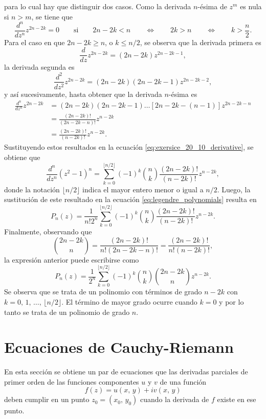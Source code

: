 \documentclass[a4paper]{report}
\begin{document}
para lo cual hay que distinguir dos casos. Como la derivada \(n\)-ésima de \(z^m\) es nula si \(n>m\), se tiene que 
\[
 \frac{d^n}{dz^n}z^{2n-2k}=0
 \qquad\textrm{si}\qquad
 2n-2k<n\qquad\Leftrightarrow\qquad 2k>n \qquad\Leftrightarrow\qquad k>\frac{n}{2}.
\]
Para el caso en que \(2n-2k\geq n\), o \(k\leq n/2\), se observa que la derivada primera es
\[
 \frac{d}{dz}z^{2n-2k}=(2n-2k)z^{2n-2k-1},
\]
la derivada segunda es
\[
 \frac{d^2}{dz^2}z^{2n-2k}=(2n-2k)(2n-2k-1)z^{2n-2k-2},
\]
y así sucesivamente, hasta obtener que la derivada \(n\)-ésima es
\begin{align*}
 \frac{d^n}{dz^n}z^{2n-2k}&=(2n-2k)(2n-2k-1)\dots[2n-2k-(n-1)]z^{2n-2k-n}\\
  &=\frac{(2n-2k)!}{(2n-2k-n)!}z^{n-2k}\\
  &=\frac{(2n-2k)!}{(n-2k)!}z^{n-2k}.
\end{align*}
Sustituyendo estos resultados en la ecuación \ref{eq:exersice_20_10_derivative}, se obtiene que 
\[
 \frac{d^n}{dz^n}(z^2-1)^n=\sum_{k=0}^{\lfloor n/2\rfloor}(-1)^k\binom{n}{k}\frac{(2n-2k)!}{(n-2k)!}z^{n-2k},
\]
donde la notación \(\lfloor n/2\rfloor\) indica el mayor entero menor o igual a \(n/2\). Luego, la sustitución de este resultado en la ecuación \ref{eq:legendre_polynomials} resulta en 
\[
 P_n(z)=\frac{1}{n!2^n}\sum_{k=0}^{\lfloor n/2\rfloor}(-1)^k\binom{n}{k}\frac{(2n-2k)!}{(n-2k)!}z^{n-2k}.
\]
Finalmente, observando que 
\[
 \binom{2n-2k}{n}=\frac{(2n-2k)!}{n!(2n-2k-n)!}=\frac{(2n-2k)!}{n!(n-2k)!},
\]
la expresión anterior puede escribirse como
\[
 P_n(z)=\frac{1}{2^n}\sum_{k=0}^{\lfloor n/2\rfloor}(-1)^k\binom{n}{k}\binom{2n-2k}{n}z^{n-2k}.
\]
Se observa que se trata de un polinomio con términos de grado \(n-2k\) con \(k=0,\,1,\,\dots,\,\lfloor n/2\rfloor\). El término de mayor grado ocurre cuando \(k=0\) y por lo tanto se trata de un polinomio de grado \(n\).

\section{Ecuaciones de Cauchy-Riemann}\label{sec:cauchy_riemann_equations}

En esta sección se obtiene un par de ecuaciones que las derivadas parciales de primer orden de las funciones componentes \(u\) y \(v\) de una función 
\[
 f(z)=u(x,\,y)+iv(x,\,y)
\]
deben cumplir en un punto \(z_0=(x_0,\,y_0)\) cuando la derivada de \(f\) existe en ese punto.
\end{document}
